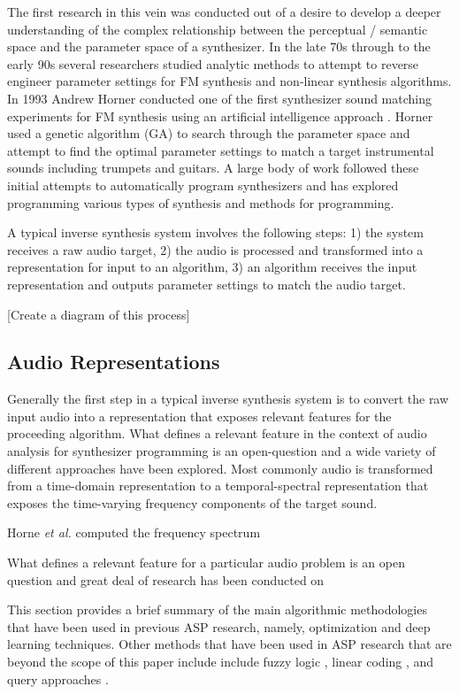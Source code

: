 The first research in this vein was conducted out of a desire to develop a deeper understanding of the complex relationship between the perceptual / semantic space and the parameter space of a synthesizer. In the late 70s through to the early 90s several researchers studied analytic methods to attempt to reverse engineer parameter settings for FM synthesis \cite{justice1979analytic, beauchamp1982synthesis, payne1987microcomputer} and non-linear synthesis \cite{delprat1990parameter} algorithms. In 1993 Andrew Horner conducted one of the first synthesizer sound matching experiments for FM synthesis using an artificial intelligence approach \cite{horner1993machine}. Horner used a genetic algorithm (GA) to search through the parameter space and attempt to find the optimal parameter settings to match a target instrumental sounds including trumpets and guitars. A large body of work followed these initial attempts to automatically program synthesizers and has explored programming various types of synthesis and methods for programming.

A typical inverse synthesis system involves the following steps: 1) the system receives a raw audio target, 2) the audio is processed and transformed into a representation for input to an algorithm, 3) an algorithm receives the input representation and outputs parameter settings to match the audio target.

[Create a diagram of this process]

\subsection{Audio Representations}
Generally the first step in a typical inverse synthesis system is to convert the raw input audio into a representation that exposes relevant features for the proceeding algorithm. What defines a relevant feature in the context of audio analysis for synthesizer programming is an open-question and a wide variety of different approaches have been explored. Most commonly audio is transformed from a time-domain representation to a temporal-spectral representation that exposes the time-varying frequency components of the target sound. 

Horne \textit{et al.} computed the frequency spectrum  

What defines a relevant feature for a particular audio problem is an open question and great deal of research has been conducted on 


This section provides a brief summary of the main algorithmic methodologies that have been used in previous ASP research, namely, optimization and deep learning techniques. Other methods that have been used in ASP research that are beyond the scope of this paper include  include fuzzy logic \cite{mitchell2005frequency, hamadicharef2012intelligent}, linear coding \cite{mintz2007toward}, and query approaches \cite{mcartwright2014}.

